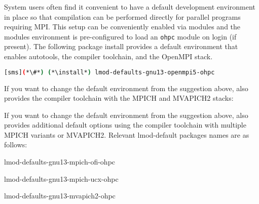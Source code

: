 System users often find it convenient to have a default development environment
in place so that compilation can be performed directly for parallel programs
requiring MPI. This setup can be conveniently enabled via modules and the \OHPC{}
modules environment is pre-configured to load an \texttt{ohpc} module on login
(if present). The following package install provides a default
environment that enables autotools, the \GNU{} compiler toolchain, and the
OpenMPI stack.

\begin{lstlisting}[language=bash]
[sms](*\#*) (*\install*) lmod-defaults-gnu13-openmpi5-ohpc
\end{lstlisting}

\begin{center}
\begin{tcolorbox}[]
\small
{}
If you want to change the default environment from the suggestion above, \OHPC{}
also provides the \GNU{} compiler toolchain with the MPICH and MVAPICH2 stacks:
\fi

If you want to change the default environment from the suggestion above, \OHPC{}
also provides additional default options using the \GNU{} compiler toolchain
with multiple MPICH variants or MVAPICH2. Relevant lmod-default packages names
are as follows:
\fi

\begin{itemize*}
\item lmod-defaults-gnu13-mpich-ofi-ohpc
\item lmod-defaults-gnu13-mpich-ucx-ohpc
\item lmod-defaults-gnu13-mvapich2-ohpc
\fi
\end{itemize*}
\end{tcolorbox}
\end{center}
